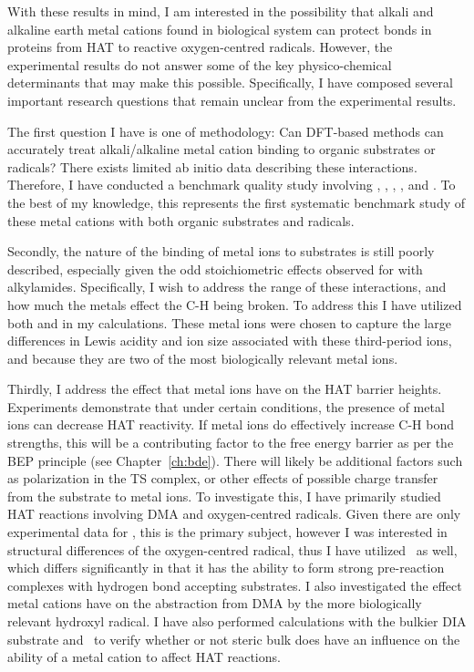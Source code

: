 With these results in mind, I am interested in the possibility that alkali and
alkaline earth metal cations found in biological system can protect 
bonds in proteins from HAT to reactive oxygen-centred radicals. However, the
experimental results do not answer some of the key physico-chemical determinants
that may make this possible. Specifically, I have composed several important
research questions that remain unclear from the experimental results.

The first question I have is one of methodology: Can DFT-based methods can
accurately treat alkali/alkaline metal cation binding to organic substrates or
radicals? There exists limited ab initio data describing these
interactions.\cite{ Siu2001, Corral2003, Suarez2011, Baldauf2013} Therefore, I
have conducted a benchmark quality study involving , ,
, , and . To the best of my knowledge, this
represents the first systematic benchmark study of these metal cations with both
organic substrates and radicals.

Secondly, the nature of the binding of metal ions to substrates is still poorly
described, especially given the odd stoichiometric effects observed for
 with alkylamides. Specifically, I wish to address the range of
these interactions, and how much the metals effect the C-H being broken. To
address this I have utilized both  and  in my calculations.
These metal ions were chosen to capture the large differences in Lewis acidity
and ion size associated with these third-period ions, and because they are two
of the most biologically relevant metal ions.

Thirdly, I address the effect that metal ions have on the HAT barrier heights.
Experiments demonstrate that under certain conditions, the presence of metal
ions can decrease HAT reactivity. If metal ions do effectively increase C-H bond
strengths, this will be a contributing factor to the free energy barrier as per
the BEP principle\cite{Bell1936,Evans1938} (see Chapter~\ref{ch:bde}). There
will likely be additional factors such as polarization in the TS complex, or
other effects of possible charge transfer from the substrate to metal ions. To
investigate this, I have primarily studied HAT reactions involving DMA and
oxygen-centred radicals. Given there are only experimental data for \cumo, this
is the primary subject, however I was interested in structural differences of
the oxygen-centred radical, thus I have utilized \bno\ as well, which differs
significantly in that it has the ability to form strong pre-reaction complexes
with hydrogen bond accepting substrates.\cite{Salamone2012, Salamone2013} I also
investigated the effect metal cations have on the abstraction from DMA by the
more biologically relevant hydroxyl radical. I have also performed calculations
with the bulkier DIA substrate and \cumo\ to verify whether or not steric bulk
does have an influence on the ability of a metal cation to affect HAT reactions.

